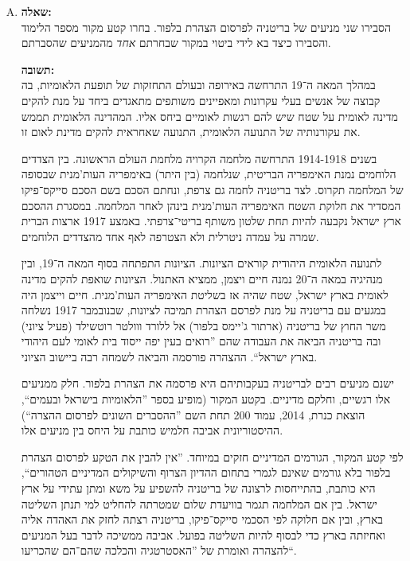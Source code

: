 \documentclass[a4paper]{article}
\newcommand\hl[1]   {#1}
\begin{document}
\begin{enumerate}[A.]
			לסיום, יש חשיבות רבה להצהרת בלפור בעבור התנועה הציונית, החל מהיקרבות להשגת הסדר ואישור ממשי מול הכוח שולט בא''י להקים מדינה לאומית, וכלה בחיזוק ואיחוד התנועה הציונית. 
			
			\item \textbf{שאלה: }\\
			הסבירו שני מניעים של בריטניה לפרסום הצהרת בלפור. בחרו קטע מקור מספר הלימוד והסבירו כיצד בא לידי ביטוי במקור שבחרתם \textit{אחד} מהמניעים שהסברתם. 
			
			\textbf{תשובה: }\\
			במהלך המאה ה־19 התרחשה באירופה ובעולם התחזקות של תופעת ה\hl{לאומיות}, בה קבוצה של אנשים בעלי עקרונות ומאפיינים משותפים מתאגדים ביחד על מנת להקים \hl{מדינה לאומית} על שטח שיש להם רגשות לאומיים ביחס אליו. המהדינה הלאומית תממש את עקורנותיה של ה\hl{תנועה הלאומית}, התנועה שאחראית להקים מדינת לאום זו. 
			
			בשנים 1914-1918 התרחשה מלחמה הקרויה \hl{מלחמת העולם הראשונה}. בין הצדדים הלוחמים נמנת האימפריה הבריטית, שנלחמה (בין היתר) באימפריה העות'מנית שבסופה של המלחמה תקרוס. לצד בריטניה לחמה גם צרפת, ונחתם הסכם בשם \hl{הסכם סייקס־פיקו} המסדיר את חלוקת השטח האימפריה העות'מנית בינהן לאחר המלחמה. במסגרת ההסכם ארץ ישראל נקבעה להיות תחת שלטון משותף בריטי־צרפתי. באמצע 1917 ארצות הברית שמרה על עמדה ניטרלית ולא הצטרפה לאף אחד מהצדדים הלוחמים. 
			
			לתנועה הלאומית היהודית קוראים \hl{הציונות}. הציונות התפתחה בסוף המאה ה־19, ובין מנהיגיה במאה ה־20 נמנה \hl{חיים ויצמן}, ממציא האתנול. הציונות שואפת להקים מדינה לאומית בארץ ישראל, שטח שהיה אז בשליטת האימפריה העות'מנית. חיים וייצמן היה במגעים עם בריטניה על מנת לפרסם הצהרת תמיכה לציונות, שבנובמבר 1917 נשלחה משר החוץ של בריטניה (ארתור ג'יימס בלפור) אל ללורד ווולטר רוטשילד (פעיל ציוני) ובה בריטניה הביאה את העבודה שהם ''רואים בעין יפה ייסוד בית לאומי לעם היהודי בארץ ישראל``. ההצהרה פורסמה והביאה לשמחה רבה ביישוב הציוני. 
			
			ישנם מניעים רבים לבריטניה בעקבותיהם היא פרסמה את הצהרת בלפור. חלק ממניעים אלו רגשיים, וחלקם מדיניים. בקטע המקור (מופיע בספר ''הלאומיות בישראל ובעמים``, הוצאת כנרת, 2014, עמוד 200 תחת השם ''ההסברים השונים לפרסום ההצרה``) ההיסטוריונית אביבה חלמיש כותבת על היחס בין מניעים אלו. 
			
			לפי קטע המקור, הגורמים המדיניים חזקים במיוחד. ''אין להבין את הטקע לפרסום הצהרת בלפור בלא גורמים שאינם לגמרי בתחום ההדיון הצרוף והשיקולים המדיניים הטהורים``, היא כותבת, בהתייחסות לרצונה של בריטניה להשפיע על משא ומתן עתידי על ארץ ישראל. בין אם המלחמה תגמר בוויעדת שלום שמטרתה להחליט למי תנתן השליטה בארץ, ובין אם חלוקה לפי הסכמי סייקס־פיקו, בריטניה רצתה לחזק את האהדה אליה ואחיזתה בארץ כדי לבסוף להיות השליטה בפועל. אביבה ממשיכה לדבר בעל המניעים להצהרה ואומרת של ''האסטרטגיה והכלכה שהם־הם שהכריעו``. 
			

\end{enumerate}
\end{document}
